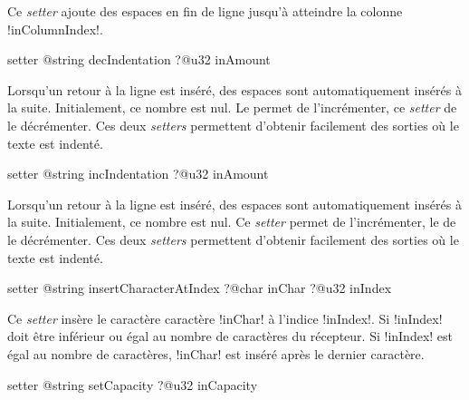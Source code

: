 Ce \emph{setter} ajoute des espaces en fin de ligne jusqu'à atteindre la colonne \ggsq!inColumnIndex!.





\begin{galgas4box}
setter @string decIndentation ?@u32 inAmount
\end{galgas4box}

Lorsqu'un retour à la ligne est inséré, des espaces sont automatiquement insérés à la suite. Initialement, ce nombre est nul. Le  permet de l'incrémenter, ce \emph{setter} de le décrémenter. Ces deux \emph{setters} permettent d'obtenir facilement des sorties où le texte est indenté.






\begin{galgas4box}
setter @string incIndentation ?@u32 inAmount
\end{galgas4box}

Lorsqu'un retour à la ligne est inséré, des espaces sont automatiquement insérés à la suite. Initialement, ce nombre est nul. Ce \emph{setter} permet de l'incrémenter, le  de le décrémenter. Ces deux \emph{setters} permettent d'obtenir facilement des sorties où le texte est indenté.









\begin{galgas4box}
setter @string insertCharacterAtIndex
   ?@char inChar
   ?@u32 inIndex
\end{galgas4box}


Ce \emph{setter} insère le caractère caractère \ggsq!inChar! à l'indice \ggsq!inIndex!. Si \ggsq!inIndex! doit être inférieur ou égal au nombre de caractères du récepteur. Si \ggsq!inIndex! est égal au nombre de caractères, \ggsq!inChar! est inséré après le dernier caractère.









\begin{galgas4box}
setter @string setCapacity ?@u32 inCapacity
\end{galgas4box}


